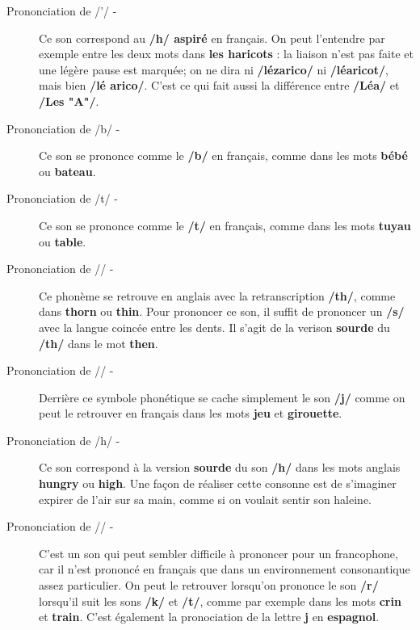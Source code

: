 \begin{description}
    \item[Prononciation de  /'/ -] 
    
    Ce son correspond au \textbf{/h/ aspiré} en français. On peut l'entendre par exemple entre les deux mots dans \textbf{les haricots} : la liaison n'est pas faite et une légère pause est marquée; on ne dira ni \textbf{/lézarico/} ni \textbf{/léaricot/}, mais bien \textbf{/lé arico/}. C'est ce qui fait aussi la différence entre \textbf{/Léa/} et \textbf{/Les "A"/}.
    
    \item[Prononciation de  /b/ -] 
    
    Ce son se prononce comme le \textbf{/b/} en français, comme dans les mots \textbf{bébé} ou \textbf{bateau}.

    \item[Prononciation de  /t/ -] 
    
    Ce son se prononce comme le \textbf{/t/} en français, comme dans les mots \textbf{tuyau} ou \textbf{table}.

    \item[Prononciation de  /\texttheta/ -] 
    
    Ce phonème se retrouve en anglais avec la retranscription \textbf{/th/}, comme dans \textbf{thorn} ou \textbf{thin}. Pour prononcer ce son, il suffit de prononcer un \textbf{/s/} avec la langue coincée entre les dents. Il s'agit de la verison \textbf{sourde} du \textbf{/th/} dans le mot \textbf{then}.
    
    \item[Prononciation de  /\textyogh/ -] 
    
    Derrière ce symbole phonétique se cache simplement le son \textbf{/j/} comme on peut le retrouver en français dans les mots \textbf{jeu} et \textbf{girouette}.

    \item[Prononciation de  /h/ -] 
    
    Ce son correspond à la version \textbf{sourde} du son \textbf{/h/} dans les mots anglais \textbf{hungry} ou \textbf{high}. Une façon de réaliser cette consonne est de s'imaginer expirer de l'air sur sa main, comme si on voulait sentir son haleine.

    \item[Prononciation de  /\textchi/ -]

    C'est un son qui peut sembler difficile à prononcer pour un francophone, car il n'est prononcé en français que dans un environnement consonantique assez particulier. On peut le retrouver lorsqu'on prononce le son \textbf{/r/} lorsqu'il suit les sons \textbf{/k/} et \textbf{/t/}, comme par exemple dans les mots \textbf{crin} et \textbf{train}. C'est également la pronociation de la lettre \textbf{j} en \textbf{espagnol}.


\end{description}

